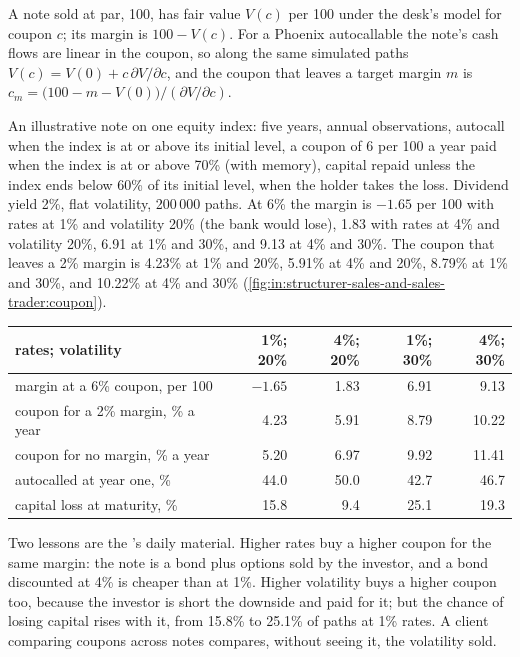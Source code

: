 \begin{method}\label{met:in:structurer-sales-and-sales-trader:margin}
A note sold at par, 100, has fair value $V(c)$ per 100 under the desk's model for coupon $c$; its margin is $100-V(c)$.
For a Phoenix autocallable the note's cash flows are linear in the coupon, so along the same simulated paths
$V(c)=V(0)+c\,\partial V/\partial c$, and the coupon that leaves a target margin $m$ is
$c_m=\bigl(100-m-V(0)\bigr)/(\partial V/\partial c)$.
\end{method}

\begin{example}\label{ex:in:structurer-sales-and-sales-trader:note}
An illustrative note on one equity index: five years, annual observations, autocall when the index is at or above its
initial level, a coupon of 6 per 100 a year paid when the index is at or above 70\% (with memory), capital repaid unless
the index ends below 60\% of its initial level, when the holder takes the loss. Dividend yield 2\%, flat volatility,
200\,000 paths. At 6\% the margin is $-1.65$ per 100 with rates at 1\% and volatility 20\% (the bank would lose), 1.83
with rates at 4\% and volatility 20\%, 6.91 at 1\% and 30\%, and 9.13 at 4\% and 30\%. The coupon that leaves a 2\%
margin is 4.23\% at 1\% and 20\%, 5.91\% at 4\% and 20\%, 8.79\% at 1\% and 30\%, and 10.22\% at 4\% and 30\%
(\cref{fig:in:structurer-sales-and-sales-trader:coupon}).
\end{example}

\begin{center}\footnotesize
\begin{tabular}{@{}lrrrr@{}}
\toprule
 rates; volatility & 1\%; 20\% & 4\%; 20\% & 1\%; 30\% & 4\%; 30\%\\
\midrule
margin at a 6\% coupon, per 100 & $-1.65$ & 1.83 & 6.91 & 9.13\\
coupon for a 2\% margin, \% a year & 4.23 & 5.91 & 8.79 & 10.22\\
coupon for no margin, \% a year & 5.20 & 6.97 & 9.92 & 11.41\\
autocalled at year one, \% & 44.0 & 50.0 & 42.7 & 46.7\\
capital loss at maturity, \% & 15.8 & 9.4 & 25.1 & 19.3\\
\bottomrule
\end{tabular}
\end{center}

Two lessons are the 's daily material. Higher rates buy a higher coupon for the same margin: the note is a
bond plus options sold by the investor, and a bond discounted at 4\% is cheaper than at 1\%. Higher volatility buys a
higher coupon too, because the investor is short the downside and paid for it; but the chance of losing capital rises
with it, from 15.8\% to 25.1\% of paths at 1\% rates. A client comparing coupons across notes compares, without seeing
it, the volatility sold.

